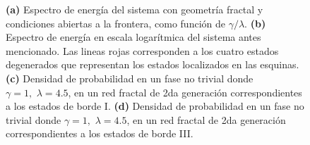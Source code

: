 \begin{figure}[h!]
        \caption{\textbf{(a)} Espectro de energía del sistema con geometría fractal y condiciones abiertas a la frontera, como función de $\gamma/\lambda$. \textbf{(b)} Espectro de energía en escala logarítmica del sistema antes mencionado. Las lineas rojas corresponden a los cuatro estados degenerados que representan los estados localizados en las esquinas. \textbf{(c)} Densidad de probabilidad en un fase no trivial donde $\gamma = 1,\, \, \lambda = 4.5$, en un red fractal de 2da generación correspondientes a los estados de borde I. \textbf{(d)} Densidad de probabilidad en un fase no trivial donde $\gamma = 1,\, \, \lambda = 4.5$, en un red fractal de 2da generación correspondientes a los estados de borde III.}
\label{fig:Param_Proy_fractal}
\end{figure}
